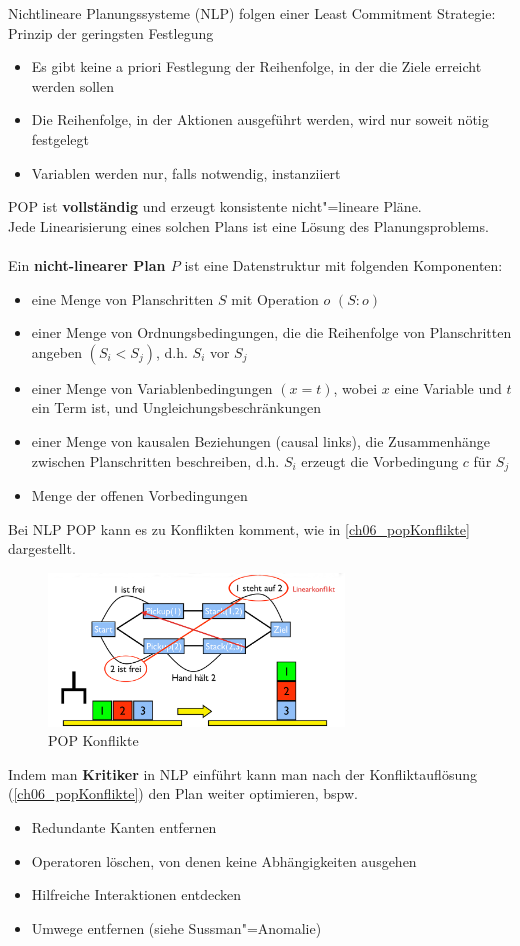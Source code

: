 Nichtlineare Planungssysteme (NLP) folgen einer Least Commitment Strategie: \glqq Prinzip der geringsten Festlegung\grqq{}
\begin{itemize}
\item Es gibt keine a priori Festlegung der Reihenfolge, in der die Ziele erreicht werden sollen
\item Die Reihenfolge, in der Aktionen ausgeführt werden, wird nur soweit nötig festgelegt
\item Variablen werden nur, falls notwendig, instanziiert
\end{itemize}
POP ist \textbf{vollständig} und erzeugt konsistente nicht"=lineare Pläne.\\
Jede Linearisierung eines solchen Plans ist eine Lösung des Planungsproblems.\\ \\
Ein \textbf{nicht-linearer Plan $P$} ist eine Datenstruktur mit folgenden Komponenten:
\begin{itemize}
\item eine Menge von Planschritten $S$ mit Operation $o$ $(S:o)$
\item einer Menge von Ordnungsbedingungen, die die Reihenfolge von Planschritten angeben $(S_i < S_j)$, d.h. \glqq $S_i$ vor $S_j$\grqq
\item einer Menge von Variablenbedingungen $(x=t)$, wobei $x$ eine Variable und $t$ ein Term ist, und Ungleichungsbeschränkungen
\item einer Menge von kausalen Beziehungen (causal links), die Zusammenhänge zwischen Planschritten beschreiben, d.h. $S_i$ erzeugt die Vorbedingung $c$ für $S_j$
\item Menge der offenen Vorbedingungen
\end{itemize}
Bei NLP POP kann es zu Konflikten komment, wie in \autoref{ch06_popKonflikte} dargestellt.
\begin{figure}[ht]\centering 
\includegraphics[width=0.7\textwidth]{figures/ch06_popKonflikte.png}
\caption{POP Konflikte}
\label{ch06_popKonflikte}
\end{figure}
Indem man \textbf{Kritiker} in NLP einführt kann man nach der Konfliktauflösung (\autoref{ch06_popKonflikte}) den Plan weiter optimieren, bspw.\
\begin{itemize}
	\item Redundante Kanten entfernen
	\item Operatoren löschen, von denen keine Abhängigkeiten ausgehen
	\item Hilfreiche Interaktionen entdecken
	\item Umwege entfernen (siehe Sussman"=Anomalie)
\end{itemize}


